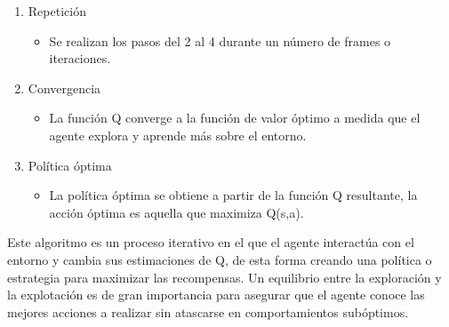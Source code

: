 \begin{enumerate}
	\item Repetición
		\begin{itemize}
			\item Se realizan los pasos del 2 al 4 durante un número de frames o iteraciones.
		\end{itemize}

	\item Convergencia
		\begin{itemize}
			\item La función Q converge a la función de valor óptimo a medida que el agente explora y aprende más sobre el entorno.
		\end{itemize}

	\item Política óptima
		\begin{itemize}
			\item La política óptima se obtiene a partir de la función Q resultante, la acción 	óptima es aquella que maximiza Q(s,a).
		\end{itemize}
\end{enumerate}
Este algoritmo es un proceso iterativo en el que el agente interactúa con el entorno y cambia sus estimaciones de Q, de esta forma creando una política o estrategia para maximizar las recompensas. Un equilibrio entre la exploración y la explotación es de gran importancia para asegurar que el agente conoce las mejores acciones a realizar sin atascarse en comportamientos subóptimos.
